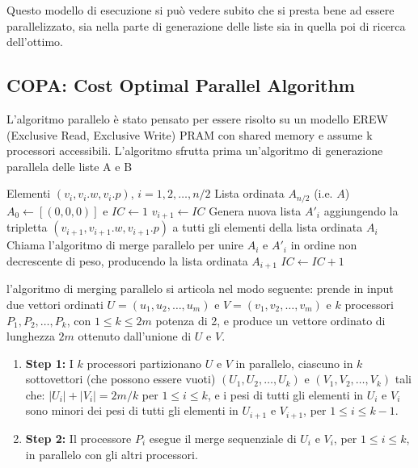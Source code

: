 \documentclass[11pt]{article}
\begin{document}
Questo modello di esecuzione si può vedere subito che si presta bene ad essere parallelizzato, sia nella parte di generazione 
delle liste sia in quella poi di ricerca dell'ottimo.  

\subsection{COPA: Cost Optimal Parallel Algorithm}
L'algoritmo parallelo è stato pensato per essere risolto su un modello EREW (Exclusive Read, Exclusive Write) PRAM con shared memory e assume k processori accessibili. 
L'algoritmo sfrutta prima un'algoritmo di generazione parallela delle liste A e B

\begin{algorithm}[H]
\caption{Algoritmo parallelo di generazione}\label{alg:parallel_gen}
\begin{algorithmic}
\Require Elementi $(v_i, v_i.w, v_i.p)$, $i = 1, 2, \ldots, n/2$
\Ensure Lista ordinata $A_{n/2}$ (i.e. $A$)
\State  $A_0 \gets [(0, 0, 0)]$ e $IC \gets 1$
    \State $v_{i+1} \gets IC$
        \State Genera nuova lista $A'_i$ aggiungendo la tripletta $(v_{i+1}, v_{i+1}.w, v_{i+1}.p)$ a tutti gli elementi della lista ordinata $A_i$
        \State Chiama l'algoritmo di merge parallelo per unire $A_i$ e $A'_i$ in ordine non decrescente di peso, producendo la lista ordinata $A_{i+1}$
    \EndFor
    \State $IC \gets IC + 1$
\EndFor
\end{algorithmic}
\end{algorithm}

l'algoritmo di merging parallelo si articola nel modo seguente: prende in input due vettori ordinati $U = (u_1, u_2, \ldots, u_m)$ e $V = (v_1, v_2, \ldots, v_m)$ e $k$ processori $P_1, P_2, \ldots, P_k$, con $1 \leq k \leq 2m$ potenza di 2, e produce un vettore ordinato di lunghezza $2m$ ottenuto dall'unione di $U$ e $V$.
\begin{enumerate}
    \item \textbf{Step 1:} I $k$ processori partizionano $U$ e $V$ in parallelo, ciascuno in $k$ sottovettori (che possono essere vuoti) $(U_1, U_2, \ldots, U_k)$ e $(V_1, V_2, \ldots, V_k)$ tali che: $|U_i| + |V_i| = 2m/k$ per $1 \leq i \leq k$, e i pesi di tutti gli elementi in $U_i$ e $V_i$ sono minori dei pesi di tutti gli elementi in $U_{i+1}$ e $V_{i+1}$, per $1 \leq i \leq k-1$.
    \item \textbf{Step 2:} Il processore $P_i$ esegue il merge sequenziale di $U_i$ e $V_i$, per $1 \leq i \leq k$, in parallelo con gli altri processori.
\end{enumerate}
\end{document}
